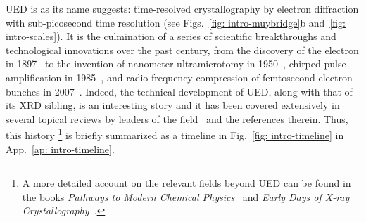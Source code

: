UED is as its name suggests: time-resolved crystallography by electron diffraction
with sub-picosecond time resolution (see Figs.~\ref{fig: intro-muybridge}b
and~\ref{fig: intro-scales}).
It is the culmination of a series of scientific breakthroughs and technological innovations
over the past century, from the discovery of the electron in 1897~\cite{Thomson1897}
to the invention of nanometer ultramicrotomy in 1950~\cite{Pease1981, Villiger1990},
chirped pulse amplification in 1985~\cite{Strickland1985}, and
radio-frequency compression of femtosecond electron bunches in 2007~\cite{vanOudheusden2007}.
%
Indeed, the technical development of UED, along with that of its XRD sibling, is an interesting story
and it has been covered extensively in several topical reviews
by leaders of the field~\cite{Glaeser1999, Zewail2006, Chergui2009, Hada2013, Carbone2012,
Centurion2016, Chergui2017, Spence2017, Ischenko2017} and the references therein.
%
Thus, this history%
\footnote{A more detailed account on the relevant fields beyond UED can be found in the books
\textit{Pathways to Modern Chemical Physics}~\cite{Califano2012} and
\textit{Early Days of X-ray Crystallography}~\cite{XRDBook}.} is briefly summarized
as a timeline in Fig.~\ref{fig: intro-timeline} in App.~\ref{ap: intro-timeline}.





%
%
%
%
%
%
%


